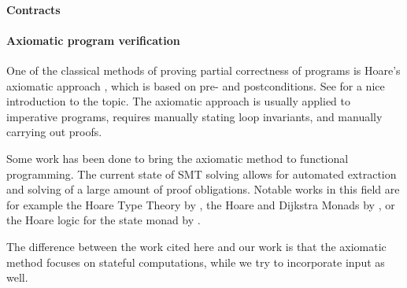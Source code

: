 \paragraph{Contracts}


\paragraph{Axiomatic program verification}
One of the classical methods of proving partial correctness of programs is Hoare's axiomatic approach \cite{Hoare1969}, which is based on pre- and postconditions.
See \citet{NielsonN1992} for a nice introduction to the topic.
The axiomatic approach is usually applied to imperative programs, requires manually stating loop invariants, and manually carrying out proofs.

Some work has been done to bring the axiomatic method to functional programming.
The current state of SMT solving allows for automated extraction and solving of a large amount of proof obligations.
Notable works in this field are for example the Hoare Type Theory by \citet{NanevskiMB2006}, the Hoare and Dijkstra Monads by \citet{NanevskiMSGB08, SwamyWSCL2013}, or the Hoare logic for the state monad by \citet{Swierstra2009}.

The difference between the work cited here and our work is that the axiomatic method focuses on stateful computations, while we try to incorporate input as well.
